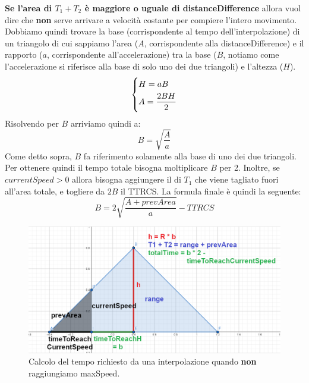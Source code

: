 \documentclass[main.tex]{subfiles}
\begin{document}
\textbf{Se l'area di $T_1 + T_2$ è maggiore o uguale di distanceDifference} allora vuol dire che \textbf{non} serve arrivare a velocità costante per compiere l'intero movimento. Dobbiamo quindi trovare la base (corrispondente al tempo dell'interpolazione) di un triangolo di cui sappiamo l'area ($A$, corrispondente alla distanceDifference) e il rapporto ($a$, corrispondente all'accelerazione) tra la base ($B$, notiamo come l'accelerazione si riferisce alla base di solo uno dei due triangoli) e l'altezza ($H$).
\[
    \begin{dcases}
        H = aB\\
        A = \frac{2BH}{2}
    \end{dcases}
\]
Risolvendo per $B$ arriviamo quindi a:
\[B = \sqrt{\frac{A}{a}}\]
\clearpage
Come detto sopra, $B$ fa riferimento solamente alla base di uno dei due triangoli. Per ottenere quindi il tempo totale bisogna moltiplicare $B$ per 2. Inoltre, se $currentSpeed > 0$ allora bisogna aggiungere il  di $T_1$ che viene tagliato fuori all'area totale, e togliere da $2B$ il TTRCS. La formula finale è quindi la seguente:
\[B = 2\sqrt{\frac{A + prevArea}{a}} - TTRCS\]
\begin{figure}[H]
    \centering
    \includegraphics[width=1\linewidth]{img/interpolazione/speedCapNoMaxSpeedCalcSplice.png}
    \caption{Calcolo del tempo richiesto da una interpolazione quando \textbf{non} raggiungiamo maxSpeed.}
    \label{fig:4_speedCapNoMaxSpeedCalcSplice}
\end{figure}
\end{document}
